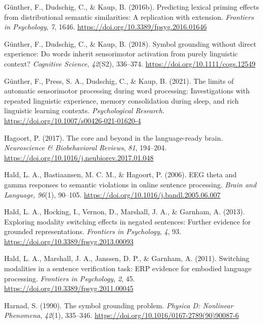 \documentclass[
  12pt,
  man,floatsintext]{apa7}
\newlength{\cslhangindent}
\newlength{\cslentryspacingunit} %
\newenvironment{CSLReferences}[2] %
 {%
  \setlength{\parindent}{0pt}
  \ifodd #1
  \let\oldpar\par
  \def\par{\hangindent=\cslhangindent\oldpar}
  \fi
  \setlength{\parskip}{#2\cslentryspacingunit}
 }%
 {}
\begin{document}
\begin{CSLReferences}{1}{0}
\leavevmode{}%
Günther, F., Dudschig, C., \& Kaup, B. (2016b). Predicting lexical priming effects from distributional semantic similarities: {A} replication with extension. \emph{Frontiers in Psychology}, \emph{7}, 1646. \url{https://doi.org/10.3389/fpsyg.2016.01646}

\leavevmode{}%
Günther, F., Dudschig, C., \& Kaup, B. (2018). Symbol grounding without direct experience: Do words inherit sensorimotor activation from purely linguistic context? \emph{Cognitive Science}, \emph{42}(S2), 336--374. \url{https://doi.org/10.1111/cogs.12549}

\leavevmode{}%
Günther, F., Press, S. A., Dudschig, C., \& Kaup, B. (2021). The limits of automatic sensorimotor processing during word processing: Investigations with repeated linguistic experience, memory consolidation during sleep, and rich linguistic learning contexts. \emph{Psychological Research}. \url{https://doi.org/10.1007/s00426-021-01620-4}

\leavevmode{}%
Hagoort, P. (2017). The core and beyond in the language-ready brain. \emph{Neuroscience \& Biobehavioral Reviews}, \emph{81}, 194--204. \url{https://doi.org/10.1016/j.neubiorev.2017.01.048}

\leavevmode{}%
Hald, L. A., Bastiaansen, M. C. M., \& Hagoort, P. (2006). {EEG} theta and gamma responses to semantic violations in online sentence processing. \emph{Brain and Language}, \emph{96}(1), 90--105. \url{https://doi.org/10.1016/j.bandl.2005.06.007}

\leavevmode{}%
Hald, L. A., Hocking, I., Vernon, D., Marshall, J. A., \& Garnham, A. (2013). Exploring modality switching effects in negated sentences: {Further} evidence for grounded representations. \emph{Frontiers in Psychology}, \emph{4}, 93. \url{https://doi.org/10.3389/fpsyg.2013.00093}

\leavevmode{}%
Hald, L. A., Marshall, J. A., Janssen, D. P., \& Garnham, A. (2011). Switching modalities in a sentence verification task: {ERP} evidence for embodied language processing. \emph{Frontiers in Psychology}, \emph{2}, 45. \url{https://doi.org/10.3389/fpsyg.2011.00045}

\leavevmode{}%
Harnad, S. (1990). The symbol grounding problem. \emph{Physica D: Nonlinear Phenomena}, \emph{42}(1), 335--346. \url{https://doi.org/10.1016/0167-2789(90)90087-6}


\end{CSLReferences}
\end{document}

